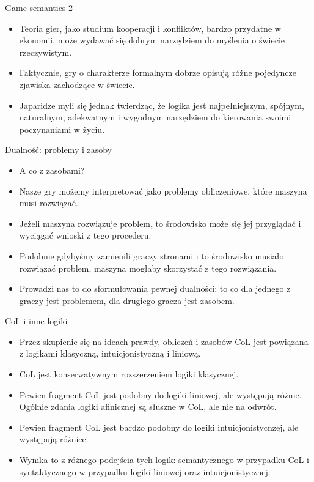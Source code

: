 \documentclass{beamer}
\begin{document}
\begin{frame}{Game semantics 2}
\begin{itemize}
	\item Teoria gier, jako studium kooperacji i konfliktów, bardzo przydatne w ekonomii, może wydawać się dobrym narzędziem do myślenia o świecie rzeczywistym.
	\item Faktycznie, gry o charakterze formalnym dobrze opisują różne pojedyncze zjawiska zachodzące w świecie.
	\item Japaridze myli się jednak twierdząc, że logika jest najpełniejszym, spójnym, naturalnym, adekwatnym i wygodnym narzędziem do kierowania swoimi poczynaniami w życiu.
\end{itemize}
\end{frame}

\begin{frame}{Dualność: problemy i zasoby}
\begin{itemize}
	\item A co z zasobami?
	\item Nasze gry możemy interpretować jako problemy obliczeniowe, które maszyna musi rozwiązać.
	\item Jeżeli maszyna rozwiązuje problem, to środowisko może się jej przyglądać i wyciągać wnioski z tego procederu.
	\item Podobnie gdybyśmy zamienili graczy stronami i to środowisko musiało rozwiązać problem, maszyna mogłaby skorzystać z tego rozwiązania.
	\item Prowadzi nas to do sformułowania pewnej dualności: to co dla jednego z graczy jest problemem, dla drugiego gracza jest zasobem.
\end{itemize}
\end{frame}

\begin{frame}{CoL i inne logiki}
\begin{itemize}
	\item Przez skupienie się na ideach prawdy, obliczeń i zasobów CoL jest powiązana z logikami klasyczną, intuicjonistyczną i liniową.
	\item CoL jest konserwatywnym rozszerzeniem logiki klasycznej.
	\item Pewien fragment CoL jest podobny do logiki liniowej, ale występują różnie. Ogólnie zdania logiki afinicznej są słuszne w CoL, ale nie na odwrót.
	\item Pewien fragment CoL jest bardzo podobny do logiki intuicjonistycnzej, ale występują różnice.
	\item Wynika to z różnego podejścia tych logik: semantycznego w przypadku CoL i syntaktycznego w przypadku logiki liniowej oraz intuicjonistycznej.
\end{itemize}
\end{frame}
\end{document}
